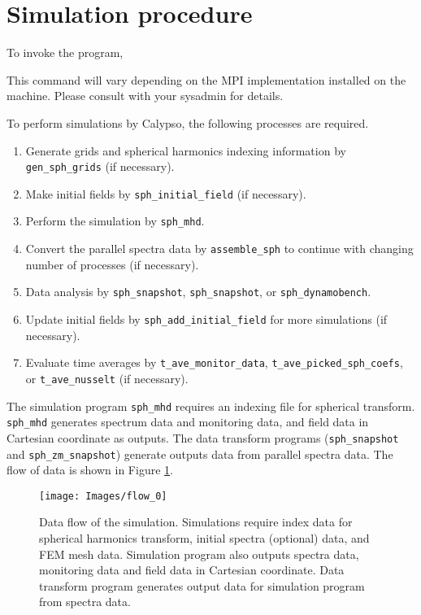 \section{Simulation procedure}
To invoke the program, 

This command will vary depending on the MPI implementation installed on the machine.  Please consult with your sysadmin for details.

%
To perform simulations by Calypso, the following processes are required.
%
\begin{enumerate}
\item Generate grids and spherical harmonics indexing information by \\
\verb|gen_sph_grids| (if necessary).
\item Make initial fields by \verb|sph_initial_field| (if necessary). 
\item Perform the simulation by \verb|sph_mhd|.
\item Convert the parallel spectra data by \verb|assemble_sph| to continue with changing number of processes (if necessary).
\item Data analysis by \verb|sph_snapshot|, \verb|sph_snapshot|, or \verb|sph_dynamobench|.
\item Update initial fields by \verb|sph_add_initial_field| for more simulations (if necessary).
\item Evaluate time averages by \verb|t_ave_monitor_data|, \verb|t_ave_picked_sph_coefs|, or \verb|t_ave_nusselt| (if necessary).
\end{enumerate}
%
The simulation program \verb|sph_mhd| requires an indexing file for spherical transform.  \verb|sph_mhd| generates spectrum data and monitoring data, and field data in Cartesian coordinate as outputs. The data transform programs (\verb|sph_snapshot| and \verb|sph_zm_snapshot|) generate outputs data  from parallel spectra data. The flow of data is shown in Figure \ref{fig:flow_0}. 
%
\begin{figure}[H]
\begin{center}
\texttt{[image: Images/flow\_0]}
\end{center}
\caption{Data flow of the simulation. Simulations require index data for spherical harmonics transform, initial spectra (optional) data, and FEM mesh data. Simulation program also outputs spectra data, monitoring data and  field data in Cartesian coordinate. Data transform program generates output data for simulation program from spectra data.}
\label{fig:flow_0}
\end{figure}
%

